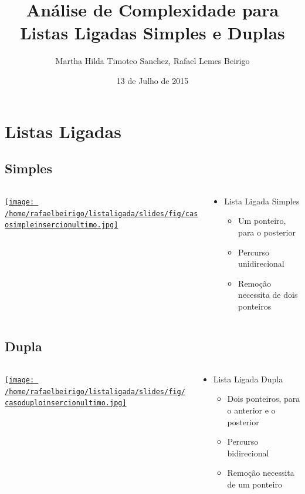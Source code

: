\documentclass[bigger]{beamer}
\author{Martha Hilda Timoteo Sanchez, Rafael Lemes Beirigo}
\date{13 de Julho de 2015}
\title{Análise de Complexidade para Listas Ligadas Simples e Duplas}
\begin{document}
\maketitle

\section{Listas Ligadas}
\label{sec-1}
\subsection{Simples}
\label{sec-1-1}
\begin{frame}[label=sec-1-1-1]{}
\begin{columns}
\begin{column}{0.6\textwidth}
\begin{center}
\href{fig/casosimpleinsercionultimo.jpg}{\texttt{[image: /home/rafaelbeirigo/listaligada/slides/fig/casosimpleinsercionultimo.jpg]}}
\end{center}
\end{column}
\begin{column}{0.4\textwidth}
\begin{itemize}
\item Lista Ligada Simples
\begin{itemize}
\item \alert{Um} ponteiro, para o posterior
\item Percurso unidirecional
\item Remoção necessita de dois ponteiros
\end{itemize}
\end{itemize}
\end{column}
\end{columns}
\end{frame}
\subsection{Dupla}
\label{sec-1-2}
\begin{frame}[label=sec-1-2-1]{}
\begin{columns}
\begin{column}{0.6\textwidth}
\begin{center}
\href{fig/casoduploinsercionultimo.jpg}{\texttt{[image: /home/rafaelbeirigo/listaligada/slides/fig/casoduploinsercionultimo.jpg]}}
\end{center}
\end{column}
\begin{column}{0.4\textwidth}
\begin{itemize}
\item Lista Ligada Dupla
\begin{itemize}
\item \alert{Dois} ponteiros, para o anterior e o posterior
\item Percurso bidirecional
\item Remoção necessita de um ponteiro
\end{itemize}
\end{itemize}
\end{column}
\end{columns}
\end{frame}
\end{document}
